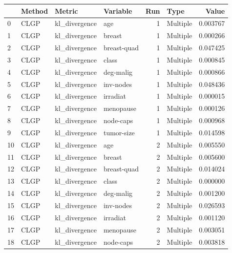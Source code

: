 \begin{tabular}{llllrlr}
\toprule
{} &   Method &                 Metric &     Variable &  Run &      Type &     Value \\
\midrule
0   &     CLGP &          kl\_divergence &          age &    1 &  Multiple &  0.003767 \\
1   &     CLGP &          kl\_divergence &       breast &    1 &  Multiple &  0.000266 \\
2   &     CLGP &          kl\_divergence &  breast-quad &    1 &  Multiple &  0.047425 \\
3   &     CLGP &          kl\_divergence &        class &    1 &  Multiple &  0.000845 \\
4   &     CLGP &          kl\_divergence &    deg-malig &    1 &  Multiple &  0.000866 \\
5   &     CLGP &          kl\_divergence &    inv-nodes &    1 &  Multiple &  0.048436 \\
6   &     CLGP &          kl\_divergence &     irradiat &    1 &  Multiple &  0.000015 \\
7   &     CLGP &          kl\_divergence &    menopause &    1 &  Multiple &  0.000126 \\
8   &     CLGP &          kl\_divergence &    node-caps &    1 &  Multiple &  0.000968 \\
9   &     CLGP &          kl\_divergence &   tumor-size &    1 &  Multiple &  0.014598 \\
10  &     CLGP &          kl\_divergence &          age &    2 &  Multiple &  0.005550 \\
11  &     CLGP &          kl\_divergence &       breast &    2 &  Multiple &  0.005600 \\
12  &     CLGP &          kl\_divergence &  breast-quad &    2 &  Multiple &  0.014024 \\
13  &     CLGP &          kl\_divergence &        class &    2 &  Multiple &  0.000000 \\
14  &     CLGP &          kl\_divergence &    deg-malig &    2 &  Multiple &  0.001200 \\
15  &     CLGP &          kl\_divergence &    inv-nodes &    2 &  Multiple &  0.026593 \\
16  &     CLGP &          kl\_divergence &     irradiat &    2 &  Multiple &  0.001120 \\
17  &     CLGP &          kl\_divergence &    menopause &    2 &  Multiple &  0.003051 \\
18  &     CLGP &          kl\_divergence &    node-caps &    2 &  Multiple &  0.003818 \\

\end{tabular}
